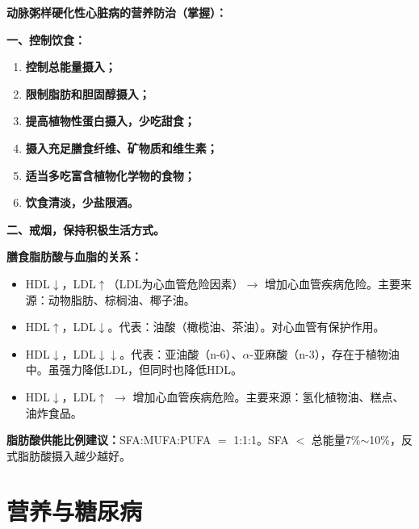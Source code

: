 \begin{keybox}
\textbf{动脉粥样硬化性心脏病的营养防治（掌握）：}

\textbf{一、控制饮食：}
\begin{enumerate}[leftmargin=*]
    \item \textbf{控制总能量摄入；}
    \item \textbf{限制脂肪和胆固醇摄入；}
    \item \textbf{提高植物性蛋白摄入，少吃甜食；}
    \item \textbf{摄入充足膳食纤维、矿物质和维生素；}
    \item \textbf{适当多吃富含植物化学物的食物；}
    \item \textbf{饮食清淡，少盐限酒。}
\end{enumerate}

\textbf{二、戒烟，保持积极生活方式。}
\end{keybox}

\begin{defbox}
\textbf{膳食脂肪酸与血脂的关系：}

\begin{itemize}[leftmargin=*]
    \item {}HDL$\downarrow$，LDL$\uparrow$（LDL为心血管危险因素）$\rightarrow$ 增加心血管疾病危险。主要来源：动物脂肪、棕榈油、椰子油。
    \item {}HDL$\uparrow$，LDL$\downarrow$。代表：油酸（橄榄油、茶油）。对心血管有保护作用。
    \item {}HDL$\downarrow$，LDL$\downarrow\downarrow$。代表：亚油酸（n-6）、$\alpha$-亚麻酸（n-3），存在于植物油中。虽强力降低LDL，但同时也降低HDL。
    \item {}HDL$\downarrow$，LDL$\uparrow$ $\rightarrow$ 增加心血管疾病危险。主要来源：氢化植物油、糕点、油炸食品。
\end{itemize}

\textbf{脂肪酸供能比例建议：}SFA:MUFA:PUFA $=$ 1:1:1。SFA $<$ 总能量7\%$\sim$10\%，反式脂肪酸摄入越少越好。
\end{defbox}

\section{营养与糖尿病}

